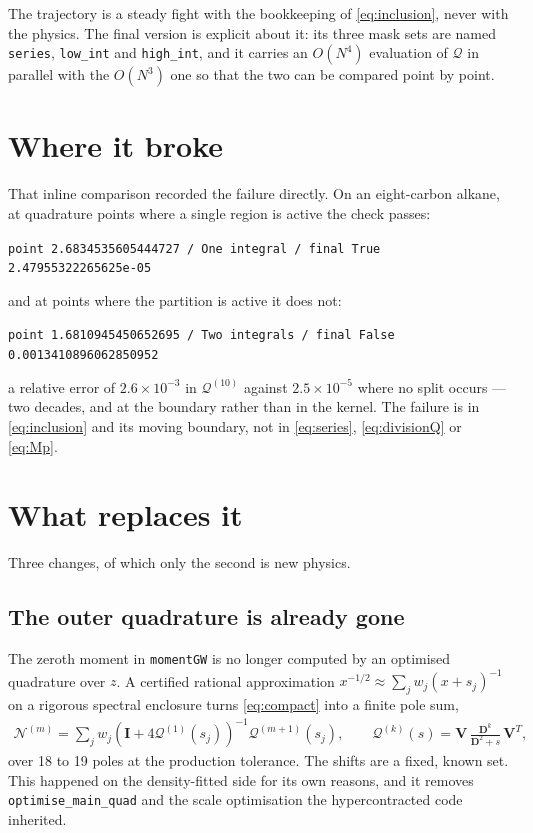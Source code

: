 \documentclass[11pt]{article}
\newcommand{\mat}[1]{{\mathbf{#1}}}
\newcommand{\parth}[1]{\left(#1\right)}
\newcommand{\Qcal}{\mathcal{Q}}
\newcommand{\Ncal}{\mathcal{N}}
\newcommand{\code}[1]{\texttt{\small #1}}
\begin{document}
The trajectory is a steady fight with the bookkeeping of \eqref{eq:inclusion}, never with
the physics. The final version is explicit about it: its three mask sets are named
\code{series}, \code{low\_int} and \code{high\_int}, and it carries an $O(N^4)$ evaluation
of $\Qcal$ in parallel with the $O(N^3)$ one so that the two can be compared point by point.

\section{Where it broke}

That inline comparison recorded the failure directly. On an eight-carbon alkane, at
quadrature points where a single region is active the check passes:
\begin{center}
\code{point 2.6834535605444727 / One integral / final True 2.47955322265625e-05}
\end{center}
and at points where the partition is active it does not:
\begin{center}
\code{point 1.6810945450652695 / Two integrals / final False 0.0013410896062850952}
\end{center}
a relative error of $2.6\times10^{-3}$ in $\Qcal^{(10)}$ against $2.5\times10^{-5}$ where no
split occurs --- two decades, and at the boundary rather than in the kernel. The failure is
in \eqref{eq:inclusion} and its moving boundary, not in \eqref{eq:series},
\eqref{eq:divisionQ} or \eqref{eq:Mp}.

\section{What replaces it}

Three changes, of which only the second is new physics.

\subsection{The outer quadrature is already gone}

The zeroth moment in \code{momentGW} is no longer computed by an optimised quadrature over
$z$. A certified rational approximation $x^{-1/2} \approx \sum_j w_j (x+s_j)^{-1}$ on a
rigorous spectral enclosure turns \eqref{eq:compact} into a finite pole sum,
\begin{align}
    \Ncal^{(m)}
    = \sum_j w_j \parth{\mat{I} + 4\Qcal^{(1)}(s_j)}^{-1} \Qcal^{(m+1)}(s_j) ,
    \qquad
    \Qcal^{(k)}(s) = \mat{V}\, \frac{\mat{D}^{k}}{\mat{D}^2 + s}\, \mat{V}^T ,
    \label{eq:poles}
\end{align}
over 18 to 19 poles at the production tolerance. The shifts are a fixed, known set. This
happened on the density-fitted side for its own reasons, and it removes
\code{optimise\_main\_quad} and the scale optimisation the hypercontracted code inherited.
\end{document}
